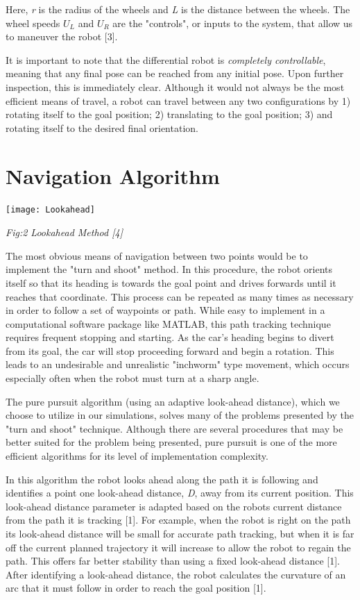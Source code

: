 \documentclass[journal]{IEEEtran}
\begin{document}
    Here, \textit{r} is the radius of the wheels and \textit{L} is the distance between the wheels. The wheel speeds $U_{L}$ and $U_{R}$ are the "controls", or inputs to the system, that allow us to maneuver the robot [3].
    
    It is important to note that the differential robot is \textit{completely controllable}, meaning that any final pose can be reached from any initial pose. Upon further inspection, this is immediately clear. Although it would not always be the most efficient means of travel, a robot can travel between any two configurations by 1) rotating itself to the goal position; 2) translating to the goal position; 3) and rotating itself to the desired final orientation.

\section{Navigation Algorithm}
    \centerline{\texttt{[image: Lookahead]}}
    \centerline{\textit{Fig:2 Lookahead Method [4]}}
    
    The most obvious means of navigation between two points would be to implement the "turn and shoot" method. In this procedure, the robot orients itself so that its heading is towards the goal point and drives forwards until it reaches that coordinate. This process can be repeated as many times as necessary in order to follow a set of waypoints or path. While easy to implement in a computational software package like MATLAB, this path tracking technique requires frequent stopping and starting. As the car's heading begins to divert from its goal, the car will stop proceeding forward and begin a rotation. This leads to an undesirable and unrealistic "inchworm" type movement, which occurs especially often when the robot must turn at a sharp angle.
    
    The pure pursuit algorithm (using an adaptive look-ahead distance), which we choose to utilize in our simulations, solves many of the problems presented by the "turn and shoot" technique. Although there are several procedures that may be better suited for the problem being presented, pure pursuit is one of the more efficient algorithms for its level of implementation complexity.
    
    In this algorithm the robot looks ahead along the path it is following and identifies a point one look-ahead distance, \textit{D}, away from its current position. This look-ahead distance parameter is adapted based on the robots current distance from the path it is tracking [1]. For example, when the robot is right on the path its look-ahead distance will be small for accurate path tracking, but when it is far off the current planned trajectory it will increase to allow the robot to regain the path.  This offers far better stability than using a fixed look-ahead distance [1]. After identifying a look-ahead distance, the robot calculates the curvature of an arc that it must follow in order to reach the goal position [1].
    
\end{document}
